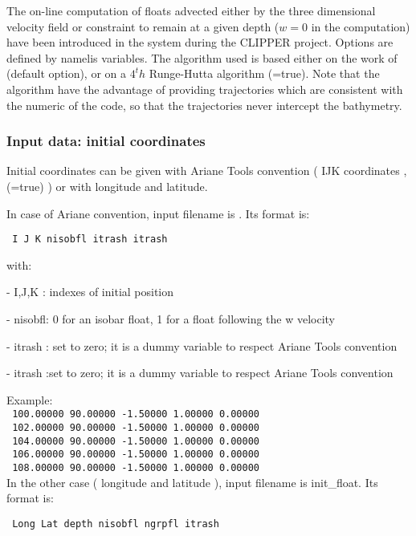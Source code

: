\documentclass[NEMO_book]{subfiles}
\begin{document}
The on-line computation of floats advected either by the three dimensional velocity 
field or constraint to remain at a given depth ($w = 0$ in the computation) have been 
introduced in the system during the CLIPPER project. Options are defined by 
namelis variables. The algorithm used is based 
either on the work of \cite{Blanke_Raynaud_JPO97} (default option), or on a $4^th$
Runge-Hutta algorithm (=true). Note that the \cite{Blanke_Raynaud_JPO97} 
algorithm have the advantage of providing trajectories which are consistent with the 
numeric of the code, so that the trajectories never intercept the bathymetry. 

\subsubsection{ Input data: initial coordinates }

Initial coordinates can be given with Ariane Tools convention ( IJK coordinates ,(=true) )
or with longitude and latitude.


In case of Ariane convention, input filename is . Its format is:

\texttt{ I J K nisobfl itrash itrash }

\noindent with: 

 - I,J,K  : indexes of initial position

 - nisobfl: 0 for an isobar float, 1 for a float following the w velocity  

 - itrash : set to zero; it is a dummy variable to respect Ariane Tools convention

 - itrash :set to zero; it is a dummy variable to respect Ariane Tools convention

\noindent Example:\\
\noindent \texttt{ 100.00000  90.00000  -1.50000 1.00000   0.00000}\\
\texttt{ 102.00000  90.00000  -1.50000 1.00000   0.00000}\\
\texttt{ 104.00000  90.00000  -1.50000 1.00000   0.00000}\\
\texttt{ 106.00000  90.00000  -1.50000 1.00000   0.00000}\\
\texttt{ 108.00000  90.00000  -1.50000 1.00000   0.00000}\\


In the other case ( longitude and latitude ), input filename is init\_float. Its format is:

\texttt{ Long Lat depth nisobfl ngrpfl itrash}
\end{document}
